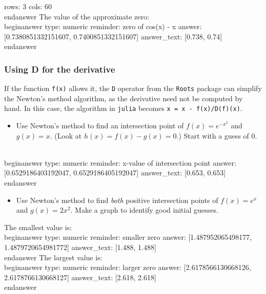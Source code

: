 \documentclass[12pt]{article}
\begin{document}
rows: 3
cols: 60
\\end{answer}
\newline
The value of the approximate zero:
\\begin{answer}
    type: numeric
    reminder: zero of cos(x) - x
    answer: [0.7380851332151607, 0.7400851332151607]
    answer_text: [0.738, 0.74] 
\\end{answer}
\subsubsection{Using D for the derivative}\newline
If the function \texttt{f(x)} allows it, the \texttt{D} operator from the \texttt{Roots} package can simplify the Newton's method algorithm, as the derivative need not be computed by hand. In this case, the algorithm in \texttt{julia} becomes \texttt{x = x - f(x)/D(f)(x)}.\begin{itemize}\item Use Newton's method to find an intersection point of $f(x) =   e^{-x^2}$ and $g(x)=x$. (Look at $h(x) = f(x) - g(x) = 0$.) Start   with a guess of $0$.\end{itemize}
\\begin{answer}
    type: numeric
    reminder: x-value of intersection point
    answer: [0.6529186403192047, 0.6529186405192047]
    answer_text: [0.653, 0.653] 
\\end{answer}
\begin{itemize}\item Use Newton's method to find \textit{both} positive intersection points of   $f(x) = e^x$ and $g(x) = 2x^2$. Make a graph to identify good   initial guesses.\end{itemize}\newline
The smallest value is:
\\begin{answer}
    type: numeric
    reminder: smaller zero
    answer: [1.487952065498177, 1.4879720654981772]
    answer_text: [1.488, 1.488] 
\\end{answer}
\newline
The largest value is:
\\begin{answer}
    type: numeric
    reminder: larger zero
    answer: [2.6178566130668126, 2.6178766130668127]
    answer_text: [2.618, 2.618] 
\\end{answer}
\end{document}
